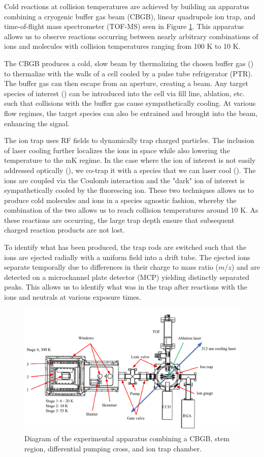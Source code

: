 Cold reactions at collision temperatures are achieved by building an apparatus combining a cryogenic buffer gas beam (CBGB), linear quadrupole ion trap, and time-of-flight mass spectrometer (TOF-MS) seen in Figure \ref{fig: apparatus}. This apparatus allows us to observe reactions occurring between nearly arbitrary combinations of ions and molecules with collision temperatures ranging from 100 K to 10 K.

The CBGB produces a cold, slow beam by thermalizing the chosen buffer gas () to thermalize with the walls of a cell cooled by a pulse tube refrigerator (PTR). The buffer gas can then escape from an aperture, creating a beam. Any target species of interest () can be introduced into the cell via fill line, ablation, etc. such that collisions with the buffer gas cause sympathetically cooling. At various flow regimes, the target species can also be entrained and brought into the beam, enhancing the signal.

The ion trap uses RF fields to dynamically trap charged particles. The inclusion of laser cooling further localizes the ions in space while also lowering the temperature to the mK regime. In the case where the ion of interest is not easily addressed optically (), we co-trap it with a species that we can laser cool (). The ions are coupled via the Coulomb interaction and the "dark" ion of interest is sympathetically cooled by the fluorescing ion. These two techniques allows us to produce cold molecules and ions in a species agnostic fashion, whereby the combination of the two allows us to reach collision temperatures around 10 K. As these reactions are occurring, the large trap depth ensure that subsequent charged reaction products are not lost.

To identify what has been produced, the trap rods are switched such that the ions are ejected radially with a uniform field into a drift tube. The ejected ions separate temporally due to differences in their charge to mass ratio ($m/z$) and are detected on a microchannel plate detector (MCP) yielding distinctly separated peaks. This allows us to identify what was in the trap after reactions with the ions and neutrals at various exposure times.

\begin{figure}
	\centering
	\includegraphics[width=\textwidth]{images/Apparatus.pdf}
	\caption{Diagram of the experimental apparatus combining a CBGB, stem region, differential pumping cross, and ion trap chamber.}
	\label{fig: apparatus}
\end{figure}
